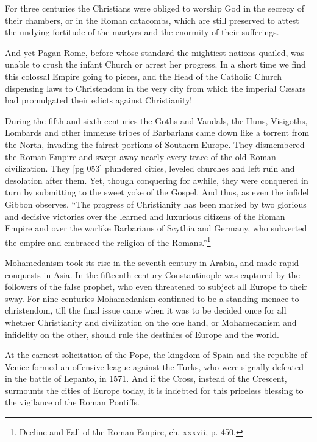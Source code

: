 For three centuries the Christians were obliged
to worship God in the secrecy of their chambers,
or in the Roman catacombs, which are still preserved
to attest the undying fortitude of the martyrs
and the enormity of their sufferings.

And yet Pagan Rome, before whose standard
the mightiest nations quailed, was unable to crush
the infant Church or arrest her progress. In a
short time we find this colossal Empire going to
pieces, and the Head of the Catholic Church dispensing
laws to Christendom in the very city
from which the imperial Cæsars had promulgated
their edicts against Christianity!

During the fifth and sixth centuries the Goths
and Vandals, the Huns, Visigoths, Lombards and
other immense tribes of Barbarians came down
like a torrent from the North, invading the fairest
portions of Southern Europe. They dismembered
the Roman Empire and swept away nearly
every trace of the old Roman civilization. They
[pg 053]
plundered cities, leveled churches and left ruin
and desolation after them. Yet, though conquering
for awhile, they were conquered in turn by
submitting to the sweet yoke of the Gospel. And
thus, as even the infidel Gibbon observes, “The
progress of Christianity has been marked by two
glorious and decisive victories over the learned
and luxurious citizens of the Roman Empire and
over the warlike Barbarians of Scythia and Germany,
who subverted the empire and embraced
the religion of the Romans.”\footnote{Decline
and Fall of the Roman Empire, ch. xxxvii, p. 450.}

Mohamedanism took its rise in the seventh
century in Arabia, and made rapid conquests in
Asia. In the fifteenth century Constantinople was
captured by the followers of the false prophet, who
even threatened to subject all Europe to their
sway. For nine centuries Mohamedanism continued
to be a standing menace to christendom, till
the final issue came when it was to be decided once
for all whether Christianity and civilization on the
one hand, or Mohamedanism and infidelity on the
other, should rule the destinies of Europe and the
world.

At the earnest solicitation of the Pope, the kingdom
of Spain and the republic of Venice formed
an offensive league against the Turks, who were
signally defeated in the battle of Lepanto, in 1571.
And if the Cross, instead of the Crescent, surmounts
the cities of Europe today, it is indebted
for this priceless blessing to the vigilance of the
Roman Pontiffs.

